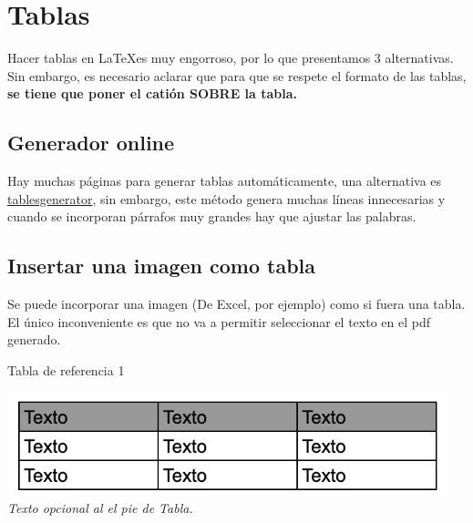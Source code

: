 \begin{figure}[b]
\end{figure}

\newpage

\section{Tablas}

Hacer tablas en \LaTeX es muy engorroso, por lo que presentamos 3 alternativas. Sin embargo, es necesario aclarar que para que se respete el formato de las tablas, \textbf{se tiene que poner el catión SOBRE la tabla.}

\subsection{Generador online}
Hay muchas páginas para generar tablas automáticamente, una alternativa es \href{https://www.tablesgenerator.com}{tablesgenerator}, sin embargo, este método genera muchas líneas innecesarias y cuando se incorporan párrafos muy grandes hay que ajustar las palabras.

\subsection{Insertar una imagen como tabla}
Se puede incorporar una imagen (De Excel, por ejemplo) como si fuera una tabla. El único inconveniente es que no va a permitir seleccionar el texto en el pdf generado.
\begin{table}[H]
    \centering
    \caption{Tabla de referencia 1}
    \includegraphics[height=3cm]{img/tablaejemplo.png} 
    \\ \textit{\scriptsize{Texto opcional al el pie de Tabla.}}
    \label{img:referencia3}
\end{table}


